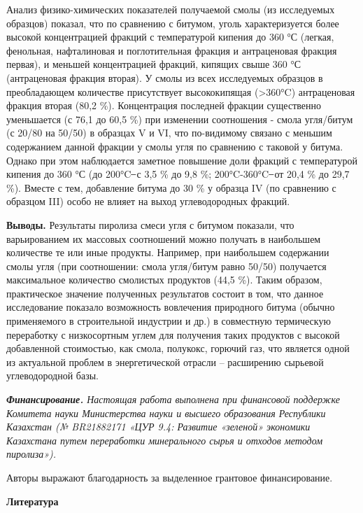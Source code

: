 \begin{multicols}{2}
Анализ физико-химических показателей получаемой смолы (из исследуемых
образцов) показал, что по сравнению с битумом, уголь характеризуется
более высокой концентрацией фракций с температурой кипения до 360 °С
(легкая, фенольная, нафталиновая и поглотительная фракция и антраценовая
фракция первая), и меньшей концентрацией фракций, кипящих свыше 360 °С
(антраценовая фракция вторая). У смолы из всех исследуемых образцов в
преобладающем количестве присутствует высококипящая (\textgreater360°C)
антраценовая фракция вторая (80,2 \%). Концентрация последней фракции
существенно уменьшается (с 76,1 до 60,5 \%) при изменении соотношения -
смола угля/битум (с 20/80 на 50/50) в образцах V и VI, что по-видимому
связано с меньшим содержанием данной фракции у смолы угля по сравнению с
таковой у битума. Однако при этом наблюдается заметное повышение доли
фракций с температурой кипения до 360 °С (до 200°C ̶ с 3,5 \% до 9,8 \%;
200°C-360°C ̶ от 20,4 \% до 29,7 \%). Вместе с тем, добавление битума до
30 \% у образца IV (по сравнению с образцом III) особо не влияет на
выход углеводородных фракций.

{\bfseries Выводы.} Результаты пиролиза смеси угля с битумом показали, что
варьированием их массовых соотношений можно получать в наибольшем
количестве те или иные продукты. Например, при наибольшем содержании
смолы угля (при соотношении: смола угля/битум равно 50/50) получается
максимальное количество смолистых продуктов (44,5 \%). Таким образом,
практическое значение полученных результатов состоит в том, что данное
исследование показало возможность вовлечения природного битума (обычно
применяемого в строительной индустрии и др.) в совместную термическую
переработку с низкосортным углем для получения таких продуктов с высокой
добавленной стоимостью, как смола, полукокс, горючий газ, что является
одной из актуальной проблем в энергетической отрасли -- расширению
сырьевой углеводородной базы.

\emph{{\bfseries Финансирование.} Настоящая работа выполнена при финансовой
поддержке Комитета науки Министерства науки и высшего образования
Республики Казахстан (№ BR21882171 «ЦУР 9.4: Развитие «зеленой»
экономики Казахстана путем переработки минерального сырья и отходов
методом пиролиза»).}

Авторы выражают благодарность за выделенное грантовое финансирование.
\end{multicols}

\begin{center}
{\bfseries Литература}
\end{center}

